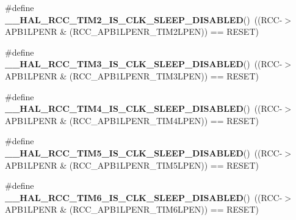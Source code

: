 \begin{DoxyCompactItemize}
\item 
\mbox{\label{group___r_c_c___clock___sleep___enable___disable___status_ga0a89c97a19d5057d710e475ff24b71ec}} 
\#define {\bfseries \+\_\+\+\_\+\+H\+A\+L\+\_\+\+R\+C\+C\+\_\+\+T\+I\+M2\+\_\+\+I\+S\+\_\+\+C\+L\+K\+\_\+\+S\+L\+E\+E\+P\+\_\+\+D\+I\+S\+A\+B\+L\+ED}()~((R\+CC-\/$>$A\+P\+B1\+L\+P\+E\+NR \& (R\+C\+C\+\_\+\+A\+P\+B1\+L\+P\+E\+N\+R\+\_\+\+T\+I\+M2\+L\+P\+EN)) == R\+E\+S\+ET)
\item 
\mbox{\label{group___r_c_c___clock___sleep___enable___disable___status_gade73c47dc34e5841b826a0e641220801}} 
\#define {\bfseries \+\_\+\+\_\+\+H\+A\+L\+\_\+\+R\+C\+C\+\_\+\+T\+I\+M3\+\_\+\+I\+S\+\_\+\+C\+L\+K\+\_\+\+S\+L\+E\+E\+P\+\_\+\+D\+I\+S\+A\+B\+L\+ED}()~((R\+CC-\/$>$A\+P\+B1\+L\+P\+E\+NR \& (R\+C\+C\+\_\+\+A\+P\+B1\+L\+P\+E\+N\+R\+\_\+\+T\+I\+M3\+L\+P\+EN)) == R\+E\+S\+ET)
\item 
\mbox{\label{group___r_c_c___clock___sleep___enable___disable___status_gaa138ce5c7fcfcfd42726b03e7de02c41}} 
\#define {\bfseries \+\_\+\+\_\+\+H\+A\+L\+\_\+\+R\+C\+C\+\_\+\+T\+I\+M4\+\_\+\+I\+S\+\_\+\+C\+L\+K\+\_\+\+S\+L\+E\+E\+P\+\_\+\+D\+I\+S\+A\+B\+L\+ED}()~((R\+CC-\/$>$A\+P\+B1\+L\+P\+E\+NR \& (R\+C\+C\+\_\+\+A\+P\+B1\+L\+P\+E\+N\+R\+\_\+\+T\+I\+M4\+L\+P\+EN)) == R\+E\+S\+ET)
\item 
\mbox{\label{group___r_c_c___clock___sleep___enable___disable___status_gaae1f723dc4b64657e58112c53514e8bc}} 
\#define {\bfseries \+\_\+\+\_\+\+H\+A\+L\+\_\+\+R\+C\+C\+\_\+\+T\+I\+M5\+\_\+\+I\+S\+\_\+\+C\+L\+K\+\_\+\+S\+L\+E\+E\+P\+\_\+\+D\+I\+S\+A\+B\+L\+ED}()~((R\+CC-\/$>$A\+P\+B1\+L\+P\+E\+NR \& (R\+C\+C\+\_\+\+A\+P\+B1\+L\+P\+E\+N\+R\+\_\+\+T\+I\+M5\+L\+P\+EN)) == R\+E\+S\+ET)
\item 
\mbox{\label{group___r_c_c___clock___sleep___enable___disable___status_gaafa07cf3cfeac5be4071e52201dfcc7d}} 
\#define {\bfseries \+\_\+\+\_\+\+H\+A\+L\+\_\+\+R\+C\+C\+\_\+\+T\+I\+M6\+\_\+\+I\+S\+\_\+\+C\+L\+K\+\_\+\+S\+L\+E\+E\+P\+\_\+\+D\+I\+S\+A\+B\+L\+ED}()~((R\+CC-\/$>$A\+P\+B1\+L\+P\+E\+NR \& (R\+C\+C\+\_\+\+A\+P\+B1\+L\+P\+E\+N\+R\+\_\+\+T\+I\+M6\+L\+P\+EN)) == R\+E\+S\+ET)

\end{DoxyCompactItemize}
